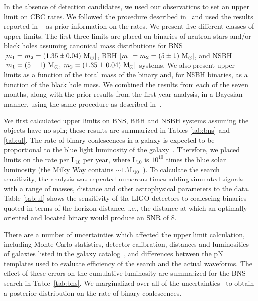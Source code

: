 In the absence of detection candidates, we used our observations to set an
upper limit on CBC rates. We followed the procedure described
in~\cite{Fairhurst:2007qj,loudestGWDAW03,Biswas:2007ni} and used the results
reported in ~\cite{Collaboration:2009tt} as prior information on the rates.  We
present five different classes of upper limits.  The first three limits are
placed on binaries of neutron stars and/or black holes assuming canonical mass
distributions for \ac{BNS} $[m_1 = m_2 = (1.35\pm 0.04)~\mathrm{M_\odot}]$, \ac{BBH} $[m_1
= m_2 = (5\pm 1)~\mathrm{M_\odot}]$, and \ac{NSBH} $[m_1 = (5\pm 1)~\mathrm{M_\odot},~m_2 = (1.35\pm
0.04)~\mathrm{M_\odot}]$ systems.  We also present upper limits as a function of the total
mass of the binary and, for \ac{NSBH} binaries, as a function of the black hole
mass. We combined the results from each of the seven months, along with the
prior results from the first year analysis, in a Bayesian manner, using the
same procedure as described in~\cite{Collaboration:2009tt}.

We first calculated upper limits on \ac{BNS}, \ac{BBH} and \ac{NSBH} systems
assuming the objects have no spin; these results are summarized in Tables
\ref{tab:bns} and \ref{tab:ul}.  The rate of binary coalescences in a galaxy is
expected to be proportional to the blue light luminosity of the
galaxy~\cite{LIGOS3S4Galaxies}.  Therefore, we placed limits on the rate per
$\mathrm{L}_{10}$ per year, where $\mathrm{L}_{10}$ is $10^{10}$ times the blue
solar luminosity (the Milky Way contains $\sim 1.7
\mathrm{L}_{10}$~\cite{Kalogera:2000dz}).  To calculate the search sensitivity,
the analysis was repeated numerous times adding simulated signals with a range
of masses, distance and other astrophysical parameters to the data. Table
\ref{tab:ul} shows the sensitivity of the LIGO detectors to coalescing binaries
quoted in terms of the horizon distance, i.e., the distance at which an
optimally oriented and located binary would produce an \ac{SNR} of 8.  

There are a number of uncertainties which affected the upper limit calculation,
including Monte Carlo statistics, detector calibration, distances and
luminosities of galaxies listed in the galaxy catalog~\cite{LIGOS3S4Galaxies},
and differences between the \ac{pN} templates used to evaluate efficiency of
the search and the actual waveforms.  The effect of these errors on the
cumulative luminosity are summarized for the \ac{BNS} search in
Table~\ref{tab:bns}.  We marginalized over all of the
uncertainties~\cite{Fairhurst:2007qj} to obtain a posterior distribution on the
rate of binary coalescences.  

